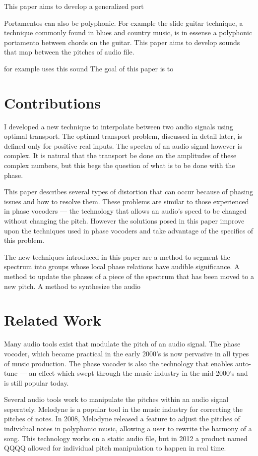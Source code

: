 \documentclass[12pt]{article}
\begin{document}
This paper aims to develop a generalized port

Portamentos can also be polyphonic. For example the slide guitar technique, a technique commonly found in blues and country music, is in essense a polyphonic portamento between chords on the guitar.
This paper aims to develop 
sounds that map between the pitches of audio file.

for example uses this sound 
The goal of this paper is to 

\section{Contributions}

I developed a new technique to interpolate between two audio signals using optimal transport.
The optimal transport problem, discussed in detail later, is defined only for positive real inputs. 
The spectra of an audio signal however is complex.
It is natural that the transport be done on the amplitudes of these complex numbers, but this begs the question of what is to be done with the phase.

This paper describes several types of distortion that can occur because of phasing issues and how to resolve them. 
These problems are similar to those experienced in phase vocoders --- the technology that allows an audio's speed to be changed without changing the pitch.
However the solutions posed in this paper improve upon the techniques used in phase vocoders and take advantage of the specifics of this problem.

The new techniques introduced in this paper are 
a method to segment the spectrum into groups whose local phase relations have audible significance.
A method to update the phases of a piece of the spectrum that has been moved to a new pitch.
A method to synthesize the audio 

\section{Related Work}

Many audio tools exist that modulate the pitch of an audio signal.
The phase vocoder, which became practical in the early 2000's is now pervasive in all types of music production. 
The phase vocoder is also the technology that enables auto-tune --- an effect which swept through the music industry in the mid-2000's and is still popular today.

Several audio tools work to manipulate the pitches within an audio signal seperately.
Melodyne is a popular tool in the music industry for correcting the pitches of notes.
In 2008, Melodyne released a feature to adjust the pitches of individual notes in polyphonic music, allowing a user to rewrite the harmony of a song.
This technology works on a static audio file, but in 2012 a product named QQQQ
allowed for individual pitch manipulation to happen in real time.
\end{document}
